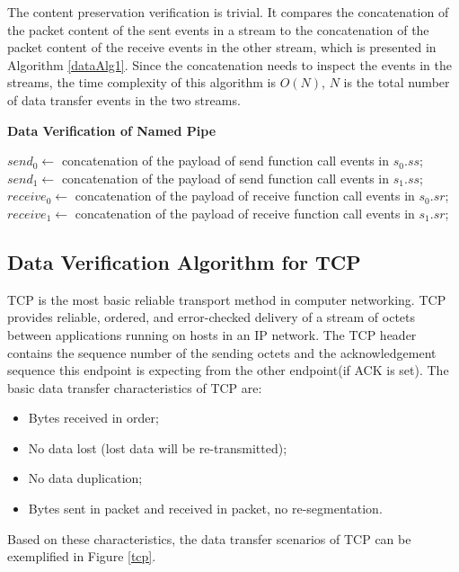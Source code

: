 \documentclass[12pt,oneside]{book}
\begin{document}
The content preservation verification is trivial. It compares the concatenation of the packet content of the sent events in a stream to the concatenation of the packet content of the receive events in the other stream, which is presented in Algorithm \ref{dataAlg1}. Since the concatenation needs to inspect the events in the streams, the time complexity of this algorithm is $O(N)$, $N$ is the total number of data transfer events in the two streams.

\begin{algorithm}[H]
\DontPrintSemicolon
\caption{{\bf Data Verification of Named Pipe} \label{dataAlg1}}
\;
$send_0 \leftarrow$ concatenation of the payload of send function call events in $s_0.ss$;\;
$send_1 \leftarrow$ concatenation of the payload of send function call events in $s_1.ss$;\;
$receive_0 \leftarrow$ concatenation of the payload of receive function call events in $s_0.sr$;\;
$receive_1 \leftarrow$ concatenation of the payload of receive function call events in $s_1.sr$;\;
\end{algorithm} 

\subsection{Data Verification Algorithm for TCP}
TCP is the most basic reliable transport method in computer networking. TCP provides reliable, ordered, and error-checked delivery of a stream of octets between applications running on hosts in an IP network. The TCP header contains the sequence number of the sending octets and the acknowledgement sequence this endpoint is expecting from the other endpoint(if ACK is set). The basic data transfer characteristics of TCP are:
\begin{itemize}
  \item Bytes received in order;
  \item No data lost (lost data will be re-transmitted);
  \item No data duplication;
  \item Bytes sent in packet and received in packet, no re-segmentation.
\end{itemize}

Based on these characteristics,  the data transfer scenarios of TCP can be exemplified in Figure \ref{tcp}.
\end{document}
